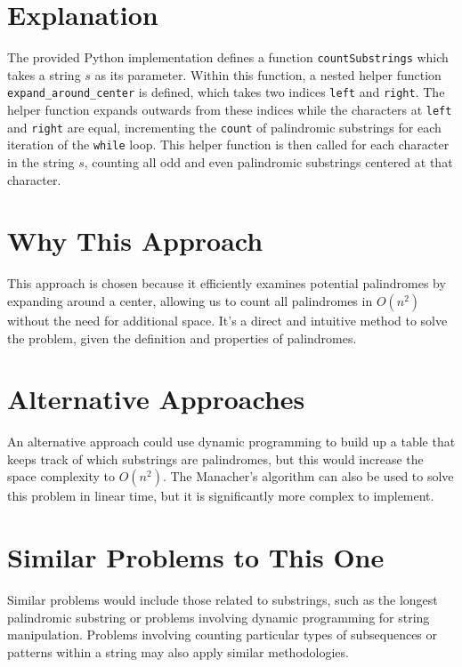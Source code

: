 \section*{Explanation}

The provided Python implementation defines a function \texttt{countSubstrings} which takes a string \( s \) as its parameter. Within this function, a nested helper function \texttt{expand\_around\_center} is defined, which takes two indices \texttt{left} and \texttt{right}. The helper function expands outwards from these indices while the characters at \texttt{left} and \texttt{right} are equal, incrementing the \texttt{count} of palindromic substrings for each iteration of the \texttt{while} loop. This helper function is then called for each character in the string \( s \), counting all odd and even palindromic substrings centered at that character.

\section*{Why This Approach}

This approach is chosen because it efficiently examines potential palindromes by expanding around a center, allowing us to count all palindromes in \( O(n^2) \) without the need for additional space. It's a direct and intuitive method to solve the problem, given the definition and properties of palindromes.

\section*{Alternative Approaches}

An alternative approach could use dynamic programming to build up a table that keeps track of which substrings are palindromes, but this would increase the space complexity to \( O(n^2) \). The Manacher’s algorithm can also be used to solve this problem in linear time, but it is significantly more complex to implement.

\section*{Similar Problems to This One}

Similar problems would include those related to substrings, such as the longest palindromic substring or problems involving dynamic programming for string manipulation. Problems involving counting particular types of subsequences or patterns within a string may also apply similar methodologies.

